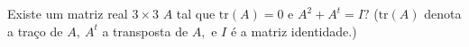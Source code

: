 Existe um matriz real \(3\times 3\) \(A\) tal que \(\text{tr}(A)=0\) e \(A^2+A^t=I?\) (\(\text{tr}(A)\) denota a traço de \(A,\ A^t\) a transposta de \(A,\) e \(I\) é a matriz identidade.)
